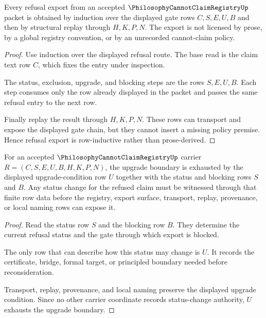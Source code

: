 \begin{theorem}
\label{thm:philosophy-cannot-claim-registry-gate-induction}
Every refusal export from an accepted $\PhilosophyCannotClaimRegistryUp$ packet is obtained by induction over the displayed gate rows $C,S,E,U,B$ and then by structural replay through $H,K,P,N$. The export is not licensed by prose, by a global registry convention, or by an unrecorded cannot-claim policy.
\end{theorem}
\begin{proof}
Use induction over the displayed refusal route. The base read is the claim text row $C$, which fixes the entry under inspection.

The status, exclusion, upgrade, and blocking steps are the rows $S,E,U,B$. Each step consumes only the row already displayed in the packet and passes the same refusal entry to the next row.

Finally replay the result through $H,K,P,N$. These rows can transport and expose the displayed gate chain, but they cannot insert a missing policy premise. Hence refusal export is row-inductive rather than prose-derived.
\end{proof}

\begin{theorem}
\label{thm:philosophy-cannot-claim-registry-upgrade-boundary-exhaustion}
For an accepted $\PhilosophyCannotClaimRegistryUp$ carrier $R=(C,S,E,U,B,H,K,P,N)$, the upgrade boundary is exhausted by the displayed upgrade-condition row $U$ together with the status and blocking rows $S$ and $B$. Any status change for the refused claim must be witnessed through that finite row data before the registry, export surface, transport, replay, provenance, or local naming rows can expose it.
\end{theorem}
\begin{proof}
Read the status row $S$ and the blocking row $B$. They determine the current refusal status and the gate through which export is blocked.

The only row that can describe how this status may change is $U$. It records the certificate, bridge, formal target, or principled boundary needed before reconsideration.

Transport, replay, provenance, and local naming preserve the displayed upgrade condition. Since no other carrier coordinate records status-change authority, $U$ exhausts the upgrade boundary.
\end{proof}

